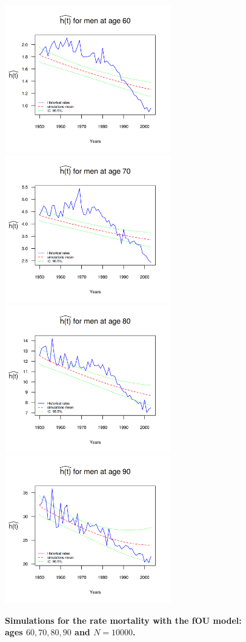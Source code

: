 \documentclass[12pt,reqno]{amsart}
\theoremstyle{definition}
\theoremstyle{remark}
\numberwithin{equation}{section}
\begin{document}
\begin{figure}[H]
\includegraphics[width = 2.85in]{PlotMen60.png}
\includegraphics[width = 2.85in]{PlotMen70.png}
\includegraphics[width = 2.85in]{PlotMen80.png}
\includegraphics[width = 2.85in]{PlotMen90.png}
\caption{\bf Simulations for the rate mortality with the fOU model: ages $60,70,80,90$ and $N=10000$.}
\label{graph-simu_FOU4}
\end{figure}\vspace*{0.1cm}
\end{document}
